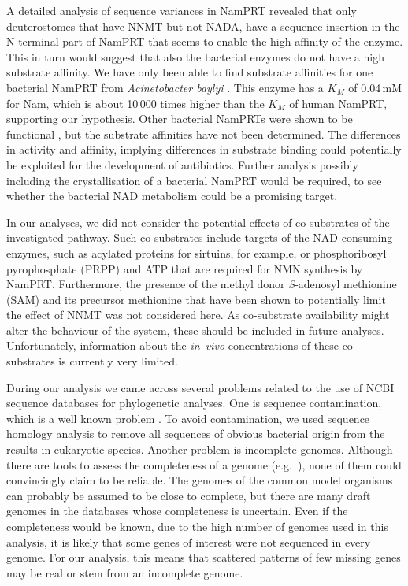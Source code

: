 A detailed analysis of sequence variances in NamPRT revealed that only deuterostomes that have NNMT but not NADA, have a sequence insertion in the N-terminal part of NamPRT that seems to enable the high affinity of the enzyme. This in turn would suggest that also the bacterial enzymes do not have a high substrate affinity. We have only been able to find substrate affinities for one bacterial NamPRT from \textit{Acinetobacter baylyi} \cite{Sorci2010}. This enzyme has a $K_{M}$ of 0.04\,mM for Nam, which is about 10\,000 times higher than the $K_{M}$ of human NamPRT, supporting our hypothesis. Other bacterial NamPRTs were shown to be functional \cite{Martin2001,Gerdes2006}, but the substrate affinities have not been determined. The differences in activity and affinity, implying differences in substrate binding could potentially be exploited for the development of antibiotics. Further analysis possibly including the crystallisation of a bacterial NamPRT would be required, to see whether the bacterial NAD metabolism could be a promising target.


In our analyses, we did not consider the potential effects of co-substrates of the investigated pathway. Such co-substrates include targets of the NAD-consuming enzymes, such as acylated proteins for sirtuins, for example, or phosphoribosyl pyrophosphate (PRPP) and ATP that are required for NMN synthesis by NamPRT. Furthermore, the presence of the methyl donor \textit{S}-adenosyl methionine (SAM) and its precursor methionine that have been shown to potentially limit the effect of NNMT \cite{Ulanovskaya2013} was not considered here. As co-substrate availability might alter the behaviour of the system, these should be included in future analyses. Unfortunately, information about the \textit{in~vivo} concentrations of these co-substrates is currently very limited.

During our analysis we came across several problems related to the use of NCBI sequence databases for phylogenetic analyses. One is sequence contamination, which is a well known problem \cite{Ballenghien2017,Longo2011}. To avoid contamination, we used sequence homology analysis to remove all sequences of obvious bacterial origin from the results in eukaryotic species. Another problem is incomplete genomes. Although there are tools to assess the completeness of a genome (e.g.~\cite{Simao2015}), none of them could convincingly claim to be reliable. The genomes of the common model organisms can probably be assumed to be close to complete, but there are many draft genomes in the databases whose completeness is uncertain. Even if the completeness would be known, due to the high number of genomes used in this analysis, it is likely that some genes of interest were not sequenced in every genome. For our analysis, this means that scattered patterns of few missing genes may be real or stem from an incomplete genome.

